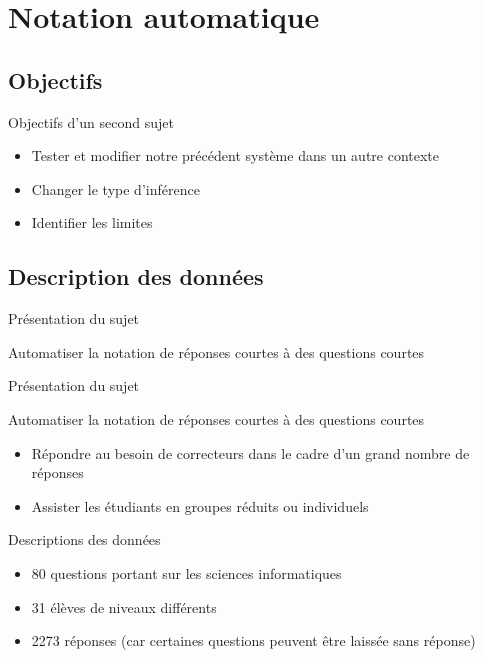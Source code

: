 \documentclass{beamer}
\theoremstyle{definition}
\begin{document}
\section{Notation automatique}
\subsection{Objectifs}

\begin{frame}{Objectifs d'un second sujet}

\begin{itemize}
\item Tester et modifier notre précédent système dans un autre contexte
\item Changer le type d'inférence
\item Identifier les limites
\end{itemize}

\end{frame}

\subsection{Description des données}

\begin{frame}{Présentation du sujet}

Automatiser la notation de réponses courtes à des questions courtes

\end{frame}

\begin{frame}{Présentation du sujet}

Automatiser la notation de réponses courtes à des questions courtes

\begin{itemize}
\item Répondre au besoin de correcteurs dans le cadre d'un grand nombre de réponses
\item Assister les étudiants en groupes réduits ou individuels
\end{itemize}

\end{frame}

\begin{frame}{Descriptions des données}

\begin{itemize}
\item 80 questions portant sur les sciences informatiques
\item 31 élèves de niveaux différents
\item 2273 réponses (car certaines questions peuvent être laissée sans réponse)
\end{itemize}

\end{frame}
\end{document}
